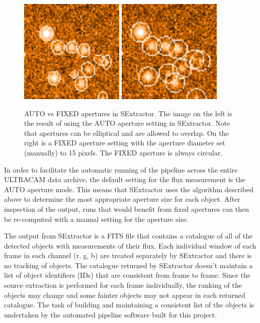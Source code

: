 \begin{figure}
  \centering
  \includegraphics[width=50mm]{images/sex_apertures_auto_cropped.png}
  \includegraphics[width=50mm]{images/sex_apertures_fixed_cropped.png}
  \caption{AUTO vs FIXED apertures in SExtractor. The image on the left is the result of using the AUTO aperture setting in SExtractor. Note that apertures can be elliptical and are allowed to overlap. On the right is a FIXED aperture setting with the aperture diameter set (manually) to 15 pixels. The FIXED aperture is always circular.}
\label{fig:fixedautoapertures}
\end{figure}

In order to facilitate the automatic running of the pipeline across the entire ULTRACAM data archive, the default setting for the flux measurement is the AUTO aperture mode. This means that SExtractor uses the algorithm described above to determine the most appropriate aperture size for each object. After inspection of the output, runs that would benefit from fixed apertures can then be re-computed with a manual setting for the aperture size. 

The output from SExtractor is a FITS file that contains a catalogue of all of the detected objects with measurements of their flux. Each individual window of each frame in each channel (r, g, b) are treated separately by SExtractor and there is no tracking of objects. The catalogue returned by SExtractor doesn't maintain a list of object identifiers (IDs) that are consistent from frame to frame. Since the source extraction is performed for each frame individually, the ranking of the objects may change and some fainter objects may not appear in each returned catalogue. The task of building and maintaining a consistent list of the objects is undertaken by the automated pipeline software built for this project. 


